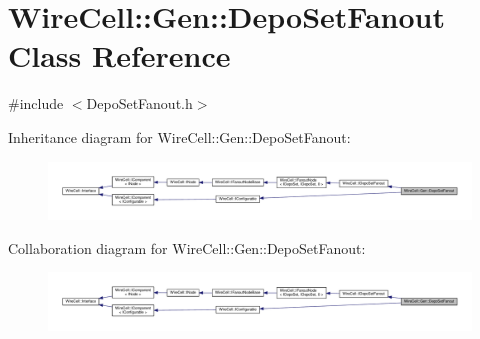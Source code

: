 \hypertarget{class_wire_cell_1_1_gen_1_1_depo_set_fanout}{}\section{Wire\+Cell\+:\+:Gen\+:\+:Depo\+Set\+Fanout Class Reference}
\label{class_wire_cell_1_1_gen_1_1_depo_set_fanout}


{\ttfamily \#include $<$Depo\+Set\+Fanout.\+h$>$}



Inheritance diagram for Wire\+Cell\+:\+:Gen\+:\+:Depo\+Set\+Fanout\+:
\nopagebreak
\begin{figure}[H]
\begin{center}
\leavevmode
\includegraphics[width=350pt]{class_wire_cell_1_1_gen_1_1_depo_set_fanout__inherit__graph}
\end{center}
\end{figure}


Collaboration diagram for Wire\+Cell\+:\+:Gen\+:\+:Depo\+Set\+Fanout\+:
\nopagebreak
\begin{figure}[H]
\begin{center}
\leavevmode
\includegraphics[width=350pt]{class_wire_cell_1_1_gen_1_1_depo_set_fanout__coll__graph}
\end{center}
\end{figure}
